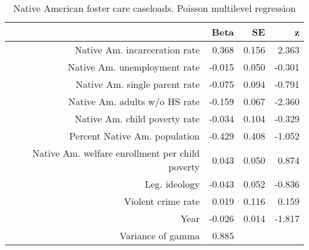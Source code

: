 \begin{table}[ht]
\centering
\caption{Native American foster care caseloads. Poisson multilevel regression} 
\label{a.c.tab}
\begin{tabular}{rrrr}
  \hline
 & Beta & SE & z \\ 
  \hline
Native Am. incarceration rate & 0.368 & 0.156 & 2.363 \\ 
  Native Am. unemployment rate & -0.015 & 0.050 & -0.301 \\ 
  Native Am. single parent rate & -0.075 & 0.094 & -0.791 \\ 
  Native Am. adults w/o HS rate & -0.159 & 0.067 & -2.360 \\ 
  Native Am. child poverty rate & -0.034 & 0.104 & -0.329 \\ 
  Percent Native Am. population & -0.429 & 0.408 & -1.052 \\ 
  Native Am. welfare enrollment per child poverty & 0.043 & 0.050 & 0.874 \\ 
  Leg. ideology & -0.043 & 0.052 & -0.836 \\ 
  Violent crime rate & 0.019 & 0.116 & 0.159 \\ 
  Year & -0.026 & 0.014 & -1.817 \\ 
  Variance of gamma & 0.885 &  &  \\ 
   \hline
\end{tabular}
\end{table}
